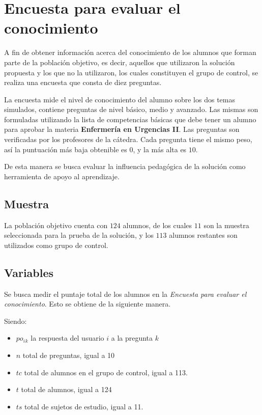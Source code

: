 
\section{Encuesta para evaluar el conocimiento}
\label{sec:objetiva}

A fin de obtener información acerca del conocimiento de los alumnos  que forman parte de la 
población objetivo, es decir, aquellos que utilizaron 
la solución propuesta y los que no la utilizaron, los cuales constituyen el grupo 
de control, se realiza una encuesta que consta de diez preguntas.

La encuesta mide el nivel de conocimiento del alumno sobre los dos temas
simulados, contiene preguntas de nivel básico, medio y avanzado. Las mismas son
formuladas utilizando la lista de competencias básicas que debe tener un alumno
para aprobar la materia \textbf{Enfermería en Urgencias II}. Las preguntas son
verificadas  por los profesores de la cátedra. Cada pregunta tiene el mismo
peso, así la puntuación más baja obtenible es $0$, y la más alta es $10$.

De esta manera se busca evaluar la influencia pedagógica de la 
solución como herramienta de apoyo al aprendizaje.


\subsection{Muestra}

La población objetivo cuenta con $124$ alumnos, de los cuales $11$ son la muestra seleccionada
para la prueba de la solución, y los $113$ alumnos restantes son utilizados
como grupo de control.

\subsection{Variables}

Se busca medir el puntaje total de los alumnos en la \emph{Encuesta para evaluar el conocimiento}. Esto 
se obtiene de la siguiente manera.

Siendo:

\begin{itemize}
    \item $po_i{_k}$ la respuesta del usuario $i$ a la pregunta $k$
    \item $n$ total de preguntas, igual a 10
    \item $tc$ total de alumnos en el grupo de control, igual a 113.
    \item $t$ total de alumnos, igual a 124
    \item $ts$ total de sujetos de estudio, igual a 11.
\end{itemize}

